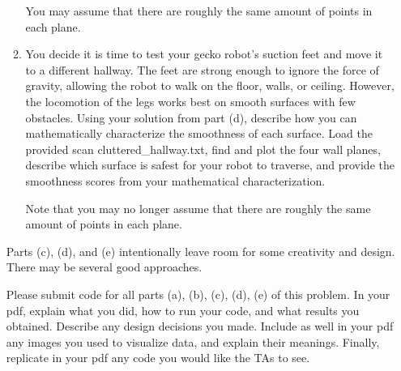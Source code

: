 \documentclass[conference,onecolumn]{IEEEtran}
\begin{document}
\begin{enumerate}[label=\arabic{enumi}.]
\begin{enumerate}
                        You may assume that there are roughly the same amount of points in each plane.
                  \item You decide it is time to test your gecko robot's suction feet and move it to a different hallway.
                        The feet are strong enough to ignore the force of gravity, allowing the robot to walk on the floor, walls, or ceiling.
                        However, the locomotion of the legs works best on smooth surfaces with few obstacles.
                        Using your solution from part (d), describe how you can mathematically characterize the smoothness of each surface.
                        Load the provided scan cluttered\_hallway.txt, find and plot the four wall planes, describe which surface is safest for your robot to traverse, and provide the smoothness scores from your mathematical characterization.

                        Note that you may no longer assume that there are roughly the same amount of points in each plane.
            \end{enumerate}
            Parts (c), (d), and (e) intentionally leave room for some creativity and design.
            There may be several good approaches.

            Please submit code for all parts (a), (b), (c), (d), (e) of this problem.
            In your pdf, explain what you did, how to run your code, and what results you obtained.
            Describe any design decisions you made.
            Include as well in your pdf any images you used to visualize data, and explain their meanings.
            Finally, replicate in your pdf any code you would like the TAs to see.
\end{enumerate}
\end{document}
